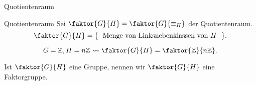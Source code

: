 \documentclass[class=article, crop=false]{standalone}
\begin{document}
\begin{zettel}{Quotientenraum}
\begin{flashcard}[je7q5v5b]{Quotientenraum}
	Sei $\faktor{G}{H} = \faktor{G}{\equiv_H}$ der Quotientenraum.
	\[
		\faktor{G}{H} = \set{\tx{ Menge von Linksnebenklassen von $H$ } }
	.\]
\end{flashcard}

\begin{example}
	\[
		G = \mathbb{Z}, H =  n \mathbb{Z} \rightsquigarrow \faktor{G}{H} =  \faktor{\mathbb{Z}}{n \mathbb{Z}}
	.\]
\end{example}

Ist $\faktor{G}{H}$ eine Gruppe, nennen wir $\faktor{G}{H}$ eine Faktorgruppe.

\end{zettel}
\end{document}

